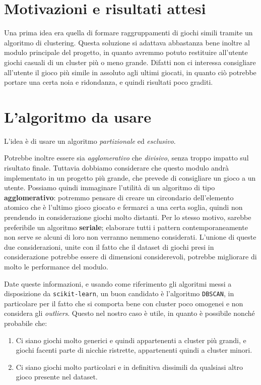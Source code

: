 \section{Motivazioni e risultati attesi}
    Una prima idea era quella di formare raggruppamenti di giochi simili tramite un algoritmo di clustering. Questa soluzione si adattava abbastanza bene inoltre al modulo principale del progetto, in quanto avremmo potuto restituire all'utente giochi casuali di un cluster più o meno grande. Difatti non ci interessa consigliare all'utente il gioco più simile in assoluto agli ultimi giocati, in quanto ciò potrebbe portare una certa noia e ridondanza, e quindi risultati poco graditi.

\section{L'algoritmo da usare}
    L'idea è di usare un algoritmo \textit{partizionale} ed \textit{esclusivo}.
        
    Potrebbe inoltre essere sia \textit{agglomerativo} che \textit{divisivo}, senza troppo impatto sul risultato finale. Tuttavia dobbiamo considerare che questo modulo andrà implementato in un progetto più grande, che prevede di consigliare un gioco a un utente. Possiamo quindi immaginare l'utilità di un algoritmo di tipo \textbf{agglomerativo}: potremmo pensare di creare un circondario dell'elemento atomico che è l'ultimo gioco giocato e fermarci a una certa soglia, quindi non prendendo in considerazione giochi molto distanti. Per lo stesso motivo, sarebbe preferibile un algoritmo \textbf{seriale}; elaborare tutti i pattern contemporaneamente non serve se alcuni di loro non verranno nemmeno considerati. L'unione di queste due considerazioni, unite con il fatto che il dataset di giochi presi in considerazione potrebbe essere di dimensioni considerevoli, potrebbe migliorare di molto le performance del modulo.
        
    Date queste informazioni, e usando come riferimento gli algoritmi messi a disposizione da \texttt{scikit-learn}, un buon candidato è l'algoritmo \texttt{DBSCAN}, in particolare per il fatto che si comporta bene con cluster poco omogenei e non considera gli \textit{outliers}. Questo nel nostro caso è utile, in quanto è possibile nonché probabile che:
    \begin{enumerate}
        \item Ci siano giochi molto generici e quindi appartenenti a cluster più grandi, e giochi facenti parte di nicchie ristrette, appartenenti quindi a cluster minori.
            
        \item Ci siano giochi molto particolari e in definitiva dissimili da qualsiasi altro gioco presente nel dataset.
    \end{enumerate}
        
